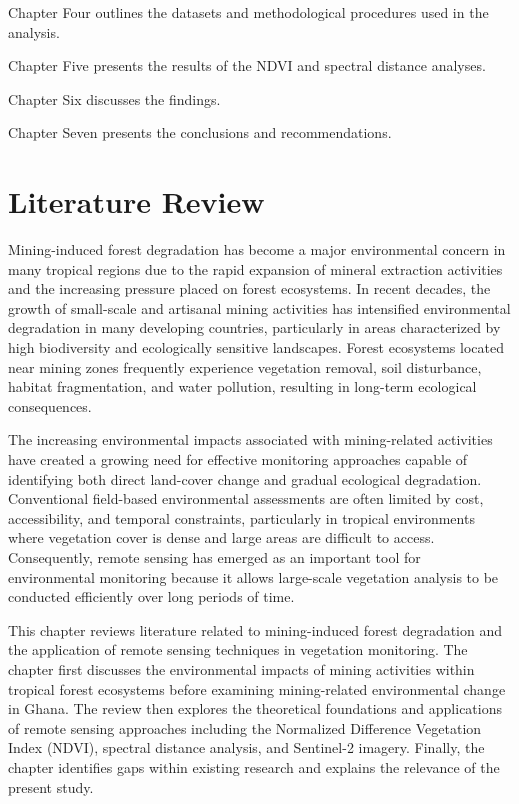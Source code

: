 \documentclass[a4paper,12pt]{report}
\begin{document}
Chapter Four outlines the datasets and methodological procedures used in the analysis.

Chapter Five presents the results of the NDVI and spectral distance analyses.

Chapter Six discusses the findings.

Chapter Seven presents the conclusions and recommendations.


\chapter{Literature Review}

Mining-induced forest degradation has become a major environmental concern in many tropical regions due to the rapid expansion of mineral extraction activities and the increasing pressure placed on forest ecosystems. In recent decades, the growth of small-scale and artisanal mining activities has intensified environmental degradation in many developing countries, particularly in areas characterized by high biodiversity and ecologically sensitive landscapes. Forest ecosystems located near mining zones frequently experience vegetation removal, soil disturbance, habitat fragmentation, and water pollution, resulting in long-term ecological consequences.

The increasing environmental impacts associated with mining-related activities have created a growing need for effective monitoring approaches capable of identifying both direct land-cover change and gradual ecological degradation. Conventional field-based environmental assessments are often limited by cost, accessibility, and temporal constraints, particularly in tropical environments where vegetation cover is dense and large areas are difficult to access. Consequently, remote sensing has emerged as an important tool for environmental monitoring because it allows large-scale vegetation analysis to be conducted efficiently over long periods of time.

This chapter reviews literature related to mining-induced forest degradation and the application of remote sensing techniques in vegetation monitoring. The chapter first discusses the environmental impacts of mining activities within tropical forest ecosystems before examining mining-related environmental change in Ghana. The review then explores the theoretical foundations and applications of remote sensing approaches including the Normalized Difference Vegetation Index (NDVI), spectral distance analysis, and Sentinel-2 imagery. Finally, the chapter identifies gaps within existing research and explains the relevance of the present study.
\end{document}
